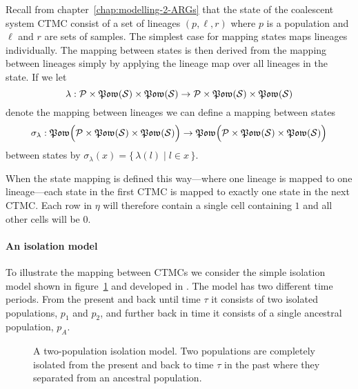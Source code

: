 Recall from chapter~\ref{chap:modelling-2-ARGs} that the state of the coalescent system CTMC consist of a set of lineages $(p,\ell,r)$ where $p$ is a population and $\ell$ and $r$ are sets of samples. The simplest case for mapping states maps lineages individually. The mapping between states is then derived from the mapping between lineages simply by applying the lineage map over all lineages in the state. If we let
\begin{displaymath}
  \lambda: \mathcal{P}\times\mathfrak{Pow}(\mathcal{S})\times\mathfrak{Pow}(\mathcal{S})
      \to \mathcal{P}\times\mathfrak{Pow}(\mathcal{S})\times\mathfrak{Pow}(\mathcal{S})
\end{displaymath}
denote the mapping between lineages we can define a mapping between states
\begin{displaymath}
  \sigma_\lambda: 
  \mathfrak{Pow}\Big(\mathcal{P}\times\mathfrak{Pow}(\mathcal{S})\times\mathfrak{Pow}(\mathcal{S})\Big)
      \to 
  \mathfrak{Pow}\Big(\mathcal{P}\times\mathfrak{Pow}(\mathcal{S})\times\mathfrak{Pow}(\mathcal{S})\Big)
\end{displaymath}
between states by $\sigma_\lambda(x) = \big\{\,\lambda(l)\;\big|\;l\in x\,\big\}$.

When the state mapping is defined this way---where one lineage is mapped to one lineage---each state in the first CTMC is mapped to exactly one state in the next CTMC. Each row in $\eta$ will therefore contain a single cell containing $1$ and all other cells will be $0$.


\paragraph{An isolation model}

To illustrate the mapping between CTMCs we consider the simple isolation model shown in figure~\ref{fig:demographic-model-isolation-model} and developed in \citet{Mailund:2011dv}. The model has two different time periods. From the present and back until time $\tau$ it consists of two isolated populations, $p_1$ and $p_2$, and further back in time it consists of a single ancestral population, $p_A$.

\begin{figure}[tb]
  \caption{A two-population isolation model. Two populations are completely isolated from the present and back to time $\tau$ in the past where they separated from an ancestral population.}
  \label{fig:demographic-model-isolation-model}
\end{figure}

